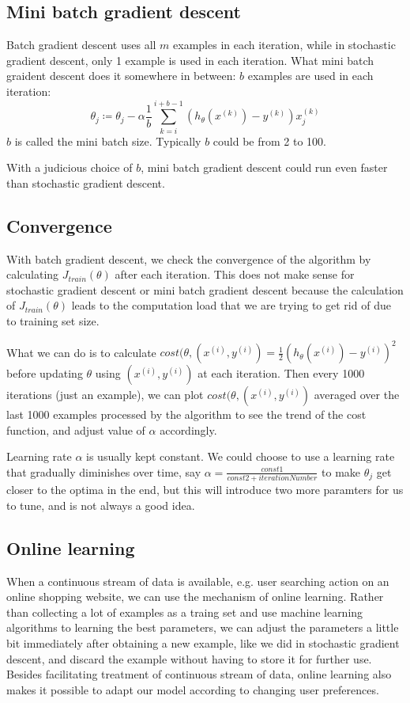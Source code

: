 \subsection{Mini batch gradient descent}
Batch gradient descent uses all $m$ examples in each iteration, while in stochastic gradient descent, only 1 example is used in each iteration. What mini batch graident descent does it somewhere in between: $b$ examples are used in each iteration:
\begin{equation}
\theta_j \coloneqq \theta_j -\alpha\frac{1}{b}\sum\limits_{k=i}^{i+b-1}(h_{\theta}(x^{(k)})-y^{(k)})x^{(k)}_j
\end{equation} $b$ is called the mini batch size. Typically $b$ could be from 2 to 100.

With a judicious choice of $b$, mini batch gradient descent could run even faster than stochastic gradient descent.
\subsection{Convergence}
With batch gradient descent, we check the convergence of the algorithm by calculating $J_{train}(\theta)$ after each iteration. This does not make sense for stochastic gradient descent or mini batch gradient descent because the calculation of $J_{train}(\theta)$ leads to the computation load that we are trying to get rid of due to training set size. 

What we can do is to calculate $cost(\theta, (x^{(i)}, y^{(i)}) = \frac{1}{2}(h_{\theta}(x^{(i)})-y^{(i)})^2$ before updating $\theta$ using $(x^{(i)}, y^{(i)})$ at each iteration. Then every 1000 iterations (just an example), we can plot $cost(\theta, (x^{(i)}, y^{(i)})$ averaged over the last 1000 examples processed by the algorithm to see the trend of the cost function, and adjust value of $\alpha$ accordingly.

Learning rate $\alpha$ is usually kept constant. We could choose to use a learning rate that gradually diminishes over time, say $\alpha = \frac{const1}{const2 + iterationNumber}$ to make $\theta_j$ get closer to the optima in the end, but this will introduce two more paramters for us to tune, and is not always a good idea. 
\subsection{Online learning}
When a continuous stream of data is available, e.g. user searching action on an online shopping website, we can use the mechanism of online learning. Rather than collecting a lot of examples as a traing set and use machine learning algorithms to learning the best parameters, we can adjust the parameters a little bit immediately after obtaining a new example, like we did in stochastic gradient descent, and discard the example without having to store it for further use. Besides facilitating treatment of continuous stream of data, online learning also makes it possible to adapt our model according to changing user preferences.

